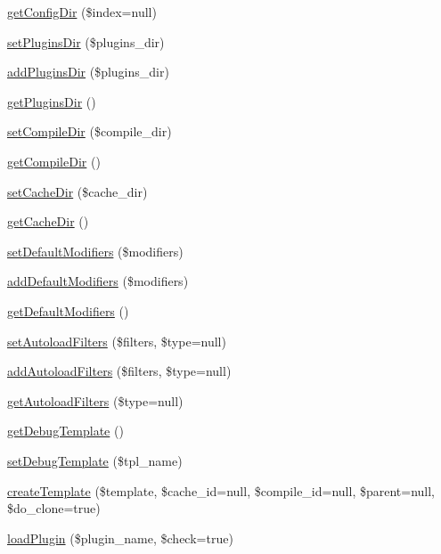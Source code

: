 \begin{DoxyCompactItemize}
\item 
\hyperlink{class_smarty_a7604f303978c5bcb3be5b32fe414a145}{get\+Config\+Dir} (\$index=null)
\item 
\hyperlink{class_smarty_a873aac031f8959adb0656b50f7e08da1}{set\+Plugins\+Dir} (\$plugins\+\_\+dir)
\item 
\hyperlink{class_smarty_a38e4a8b98e674d0087e8b4994c52f339}{add\+Plugins\+Dir} (\$plugins\+\_\+dir)
\item 
\hyperlink{class_smarty_a9d88a1d1661f7715a088da30c7923988}{get\+Plugins\+Dir} ()
\item 
\hyperlink{class_smarty_a53fa3b76ddf8efe99da1769a2fb8ebc2}{set\+Compile\+Dir} (\$compile\+\_\+dir)
\item 
\hyperlink{class_smarty_a25277db590df3efa755513c2483c8442}{get\+Compile\+Dir} ()
\item 
\hyperlink{class_smarty_aee1d7535f4c8f43b21808040629cde4f}{set\+Cache\+Dir} (\$cache\+\_\+dir)
\item 
\hyperlink{class_smarty_af1aaf85d6756805f7dabac5feb2fa952}{get\+Cache\+Dir} ()
\item 
\hyperlink{class_smarty_aa42715e252f461173bb9333f7a5d5331}{set\+Default\+Modifiers} (\$modifiers)
\item 
\hyperlink{class_smarty_a8d48a5ce2e5f2e85aca029bd99002a47}{add\+Default\+Modifiers} (\$modifiers)
\item 
\hyperlink{class_smarty_afff9ce9a461a6328d4c72f6db9c8cbea}{get\+Default\+Modifiers} ()
\item 
\hyperlink{class_smarty_a4c88d7759e6d9c3db2a4fa342fb51de8}{set\+Autoload\+Filters} (\$filters, \$type=null)
\item 
\hyperlink{class_smarty_a0c80e992e5d7b2537d734bd171320ef3}{add\+Autoload\+Filters} (\$filters, \$type=null)
\item 
\hyperlink{class_smarty_a7cf0060f285a8eec99641ec5e04828be}{get\+Autoload\+Filters} (\$type=null)
\item 
\hyperlink{class_smarty_ae610d8b4e8b1d981331997a305ca251d}{get\+Debug\+Template} ()
\item 
\hyperlink{class_smarty_a00b86222ed243e16f2baff09dfe9520d}{set\+Debug\+Template} (\$tpl\+\_\+name)
\item 
\hyperlink{class_smarty_aa9d5dc127ac405069eea53703fe12668}{create\+Template} (\$template, \$cache\+\_\+id=null, \$compile\+\_\+id=null, \$parent=null, \$do\+\_\+clone=true)
\item 
\hyperlink{class_smarty_a896a380e37f5391029e1d079ac7ee1e9}{load\+Plugin} (\$plugin\+\_\+name, \$check=true)

\end{DoxyCompactItemize}
